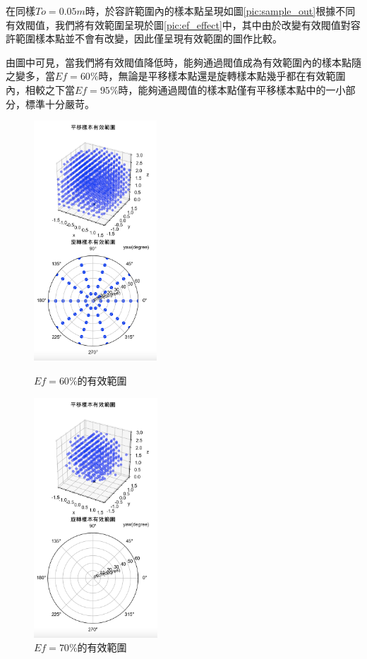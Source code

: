 在同樣$To=0.05m$時，於容許範圍內的樣本點呈現如圖\ref{pic:sample_out}根據不同有效閥值，我們將有效範圍呈現於圖\ref{pic:ef_effect}中，其中由於改變有效閥值對容許範圍樣本點並不會有改變，因此僅呈現有效範圍的圖作比較。

由圖中可見，當我們將有效閥值降低時，能夠通過閥值成為有效範圍內的樣本點隨之變多，當$Ef=60\%$時，無論是平移樣本點還是旋轉樣本點幾乎都在有效範圍內，相較之下當$Ef=95\%$時，能夠通過閥值的樣本點僅有平移樣本點中的一小部分，標準十分嚴苛。


\begin{figure}[htpb]
    \centering
    \begin{minipage}{.5\textwidth}
        \centering
        \includegraphics[height = 9cm]{ch4pic/ef60.png}
        \caption{$Ef=60\%$的有效範圍}
        \label{pic:ef60}
    \end{minipage}%
    \begin{minipage}{0.5\textwidth}
        \centering
        \includegraphics[height = 9cm]{ch4pic/ef70.png}
        \caption{$Ef=70\%$的有效範圍}
        \label{pic:ef70}
    \end{minipage}
\end{figure}


